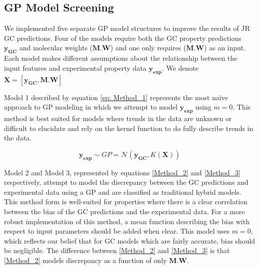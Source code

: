 \documentclass[journal=jacsat,manuscript=article]{achemso}
\begin{document}


\subsection{GP Model Screening}
We implemented five separate GP model structures to improve the results of JR GC predictions. Four of the models require both the GC property predictions $\mathbf{y_{GC}}$ and molecular weights ($\mathbf{M.W}$) and one only requires ($\mathbf{M.W}$) as an input. Each model makes different assumptions about the relationship between the input features and experimental property data $\mathbf{y_{\text{exp}}}$. We denote $\mathbf{X} = [\mathbf{y_{GC}}, \mathbf{M.W}]$

Model 1 described by equation \eqref{eq: Method_1} represents the most na\"ive approach to GP modeling in which we attempt to model $\mathbf{y_{\text{exp}}}$ using $m=0$. This method is best suited for models where trends in the data are unknown or difficult to elucidate and rely on the kernel function to do fully describe trends in the data.

\begin{equation}
    \mathbf{y_{\text{exp}}} \sim  GP = \mathcal{N}\left(\mathbf{y_{GC}}, K(\mathbf{X}) \right)
    \label{eq: Method_1}
\end{equation}

Model 2 and Model 3, represented by equations \eqref{Method_2} and \eqref{Method_3} respectively, attempt to model the discrepancy between the GC predictions and experimental data using a GP and are classified as traditional hybrid models. This method form is well-suited for properties where there is a clear correlation between the bias of the GC predictions and the experimental data. For a more robust implementation of this method, a mean function describing the bias with respect to input parameters should be added when clear. This model uses $m=0$, which reflects our belief that for GC models which are fairly accurate, bias should be negligible. The difference between \eqref{Method_2} and \eqref{Method_3} is that \eqref{Method_2} models discrepancy as a function of only $\mathbf{M.W}$.
\end{document}
